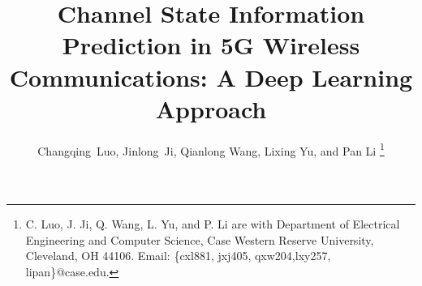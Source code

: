 \documentclass[10pt,journal,cspaper,compsoc]{IEEEtran}
\begin{document}
%
\title{Channel State Information Prediction in 5G Wireless Communications: A Deep Learning Approach}
%
%
%

\author{\normalsize{Changqing~Luo, Jinlong~Ji, Qianlong Wang, Lixing Yu, and Pan Li}
\thanks{C. Luo, J. Ji, Q. Wang, L. Yu, and P. Li are with Department of Electrical Engineering and Computer Science, Case Western Reserve University, Cleveland, OH 44106. Email: \{cxl881, jxj405, qxw204,lxy257, lipan\}@case.edu.}
}



%
%
\end{document}
